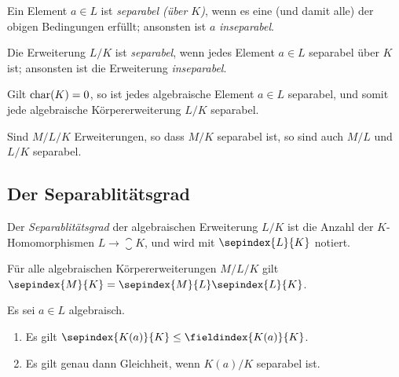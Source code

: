 \begin{definition}
  Ein Element $a \in L$ ist \emph{separabel \textup(über $K$\textup)}, wenn es eine \textup(und damit alle\textup) der obigen Bedingungen erfüllt;
  ansonsten ist $a$ \emph{inseparabel}.
  
  Die Erweiterung $L/K$ ist \emph{separabel}, wenn jedes Element $a \in L$ separabel über $K$ ist;
  ansonsten ist die Erweiterung \emph{inseparabel}.
\end{definition}

\begin{example}
  Gilt $\operatorname{char}(K) = 0$, so ist jedes algebraische Element $a \in L$ separabel, und somit jede algebraische Körpererweiterung $L/K$ separabel.
\end{example}

\begin{lemma}
  Sind $M/L/K$ Erweiterungen, so dass $M/K$ separabel ist, so sind auch $M/L$ und $L/K$ separabel.
\end{lemma}



\subsection{Der Separablitätsgrad}

\begin{definition}
  Der \emph{Separablitätsgrad} der algebraischen Erweiterung $L/K$ ist die Anzahl der $K$-Homomorphismen $L \to \closure{K}$, und wird mit $\sepindex{L}{K}$ notiert.
\end{definition}

\begin{lemma}
  Für alle algebraischen Körpererweiterungen $M/L/K$ gilt $\sepindex{M}{K} = \sepindex{M}{L} \sepindex{L}{K}$.
\end{lemma}

\noindent
\begin{minipage}[t]{\textwidth}
\begin{lemma}
  Es sei $a \in L$ algebraisch.
  \begin{enumerate}
    \item
      Es gilt $\sepindex{K(a)}{K} \leq \fieldindex{K(a)}{K}$.
    \item
      Es gilt genau dann Gleichheit, wenn $K(a)/K$ separabel ist.
  \end{enumerate}
\end{lemma}
\end{minipage}

